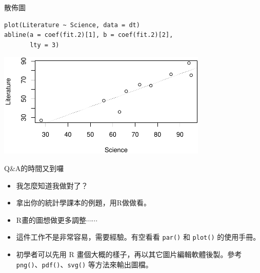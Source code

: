 \documentclass[14pt, aspectratio=43]{beamer}
\begin{document}
\begin{frame}[fragile]{散佈圖}

\begin{verbatim}
plot(Literature ~ Science, data = dt)
abline(a = coef(fit.2)[1], b = coef(fit.2)[2],
       lty = 3)
\end{verbatim}

\begin{center}
\includegraphics[width=0.75\textwidth]{Rplot-sct.pdf}
\end{center}
\end{frame}

%







\begin{frame}[fragile]{Q\&A的時間又到囉}
\begin{itemize}
\item[Q] 我怎麼知道我做對了？
\item[A] 拿出你的統計學課本的例題，用R做做看。
\end{itemize}
\begin{itemize}\item[Q] R畫的圖想做更多調整$\cdots\cdots$
\item[A1] 這件工作不是非常容易，需要經驗。有空看看 \verb+par()+ 和 \verb+plot()+ 的使用手冊。
\item[A2] 初學者可以先用 R 畫個大概的樣子，再以其它圖片編輯軟體後製。參考 \verb+png()+、\verb+pdf()+、\verb+svg()+ 等方法來輸出圖檔。
\end{itemize}
\end{frame}
\end{document}
